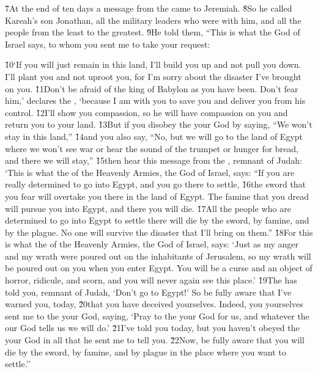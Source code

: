 \v{7}At the end of ten days a message from the  came to Jeremiah. \v{8}So he called Kareah's son Jonathan, all the military leaders who were with him, and all the people from the least to the greatest. \v{9}He told them, ``This is what the  God of Israel says, to whom you sent me to take your request:

\begin{poetry}
\poeml \v{10}`If you will just remain in this land, I'll build you up and not pull you down. I'll plant you and not uproot you, for I'm sorry about the disaster I've brought on you. \v{11}Don't be afraid of the king of Babylon as you have been. Don't fear him,' declares the , `because I am with you to save you and deliver you from his control. \v{12}I'll show you compassion, so he will have compassion on you and return you to your land. \v{13}But if you disobey the  your God by saying, ``We won't stay in this land,'' \v{14}and you also say, ``No, but we will go to the land of Egypt where we won't see war or hear the sound of the trumpet or hunger for bread, and there we will stay,'' \v{15}then hear this message from the , remnant of Judah: `This is what the  of the Heavenly Armies, the God of Israel, says: ``If you are really determined to go into Egypt, and you go there to settle, \v{16}the sword that you fear will overtake you there in the land of Egypt. The famine that you dread will pursue you into Egypt, and there you will die. \v{17}All the people who are determined to go into Egypt to settle there will die by the sword, by famine, and by the plague. No one will survive the disaster that I'll bring on them.'' \v{18}For this is what the  of the Heavenly Armies, the God of Israel, says: `Just as my anger and my wrath were poured out on the inhabitants of Jerusalem, so my wrath will be poured out on you when you enter Egypt. You will be a curse and an object of horror, ridicule, and scorn, and you will never again see this place.' \v{19}The  has told you, remnant of Judah, `Don't go to Egypt!' So be fully aware that I've warned you, today, \v{20}that you have deceived yourselves. Indeed, you yourselves sent me to the  your God, saying, `Pray to the  your God for us, and whatever the  our God tells us we will do.' \v{21}I've told you today, but you haven't obeyed the  your God in all that he sent me to tell you. \v{22}Now, be fully aware that you will die by the sword, by famine, and by plague in the place where you want to settle.''
\end{poetry}

